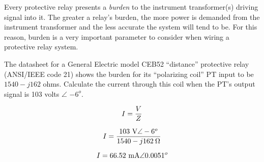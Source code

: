 

Every protective relay presents a {\it burden} to the instrument transformer(s) driving signal into it.  The greater a relay's burden, the more power is demanded from the instrument transformer and the less accurate the system will tend to be.  For this reason, burden is a very important parameter to consider when wiring a protective relay system.

\vskip 10pt

The datasheet for a General Electric model CEB52 ``distance'' protective relay (ANSI/IEEE code 21) shows the burden for its ``polarizing coil'' PT input to be $1540 - j162$ ohms.  Calculate the current through this coil when the PT's output signal is 103 volts $\angle$ $-6^o$.







$$I = {V \over Z}$$

$$I = {103 \hbox{ V} \angle -6^o \over 1540 - j162 \> \Omega}$$

$$I = 66.52 \hbox{ mA} \angle 0.0051^o$$









